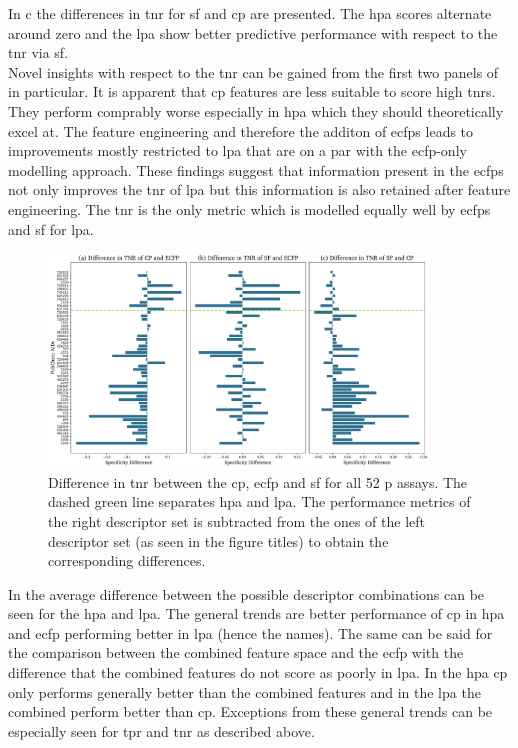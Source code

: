 In c the differences in \ac{tnr} for \acl{sf} and \ac{cp} are presented. The \acl{hpa} scores alternate around zero and the \acl{lpa} show better predictive performance with respect to the \ac{tnr} via \acl{sf}.\\
Novel insights with respect to the \ac{tnr} can be gained from the first two panels of  in particular. It is apparent that \ac{cp} features are less suitable to score high \ac{tnr}s. They perform comprably worse especially in \acl{hpa} which they should theoretically excel at. The feature engineering and therefore the additon of \ac{ecfp}s leads to improvements mostly restricted to \acl{lpa} that are on a par with the \ac{ecfp}-only modelling approach. These findings suggest that information present in the \ac{ecfp}s not only improves the \ac{tnr} of \acl{lpa} but this information is also retained after feature engineering. The \ac{tnr} is the only metric which is modelled equally well by \ac{ecfp}s and \ac{sf} for \acl{lpa}.\\
\begin{figure}[H]
	\centering
	\includegraphics[width=0.9\textwidth]{figures/SpecifComparison.pdf}
	\caption[Difference in \ac{tnr} Between the \ac{cp}, \ac{ecfp} and \ac{sf}]{Difference in \acl{tnr} between the \ac{cp}, \ac{ecfp} and \acf{sf} for all 52 \acl{p} assays. The dashed green line separates \acl{hpa} and \acl{lpa}. The performance metrics of the right descriptor set is subtracted from the ones of the left descriptor set (as seen in the figure titles) to obtain the corresponding differences.}
	\label{fig:diffsepcif}
\end{figure}\noindent
In  the average difference between the possible descriptor combinations can be seen for the \acl{hpa} and \acl{lpa}. The general trends are better performance of \ac{cp} in \acl{hpa} and \ac{ecfp} performing better in \acl{lpa} (hence the names). The same can be said for the comparison between the combined feature space and the \ac{ecfp} with the difference that the combined features do not score as poorly in \acl{lpa}. In the \acl{hpa} \ac{cp} only performs generally better than the combined features and in the \acl{lpa} the combined perform better than \ac{cp}. Exceptions from these general trends can be especially seen for \ac{tpr} and \ac{tnr} as described above.
